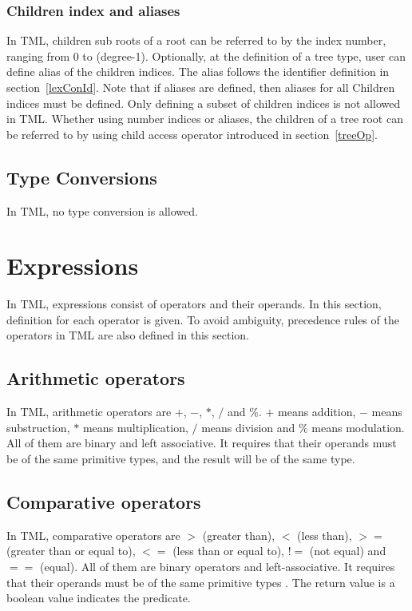 \documentclass[12pt,psfig,a4]{article}
\begin{document}

\subsubsection {Children index and aliases}
In TML, children sub roots of a root can be referred to by the index number, ranging from 0 to (degree-1). Optionally, at the definition of a tree type, user can define alias of the children indices. The alias follows the identifier definition in section~\ref{lexConId}. Note that if aliases are defined, then aliases for all Children indices must be defined. Only defining a subset of children indices is not allowed in TML. Whether using number indices or aliases, the children of a tree root can be referred to by using child access operator introduced in section~\ref{treeOp}.

\subsection {Type Conversions}
In TML, no type conversion is allowed.



\section{Expressions}
In TML, expressions consist of operators and their operands. In this section, definition for each operator is given. To avoid ambiguity, precedence rules of the operators in TML are also defined in this section.

\subsection{Arithmetic operators}
In TML, arithmetic operators are $+$, $-$, $*$, $/$ and $\%$. $+$ means addition, $-$ means substruction, $*$ means multiplication, $/$ means division and $\%$ means modulation. All of them are binary and left associative. It requires that their operands must be of the same primitive types, and the result will be of the same type.

\subsection{Comparative operators}
In TML, comparative operators are $>$ (greater than), $<$ (less than), $>=$ (greater than or equal to), $<=$ (less than or equal to), $!=$ (not equal) and $==$ (equal). All of them are binary operators and left-associative. It requires that their operands must be of the same primitive types . The return value is a boolean value indicates the predicate.
\end{document}
